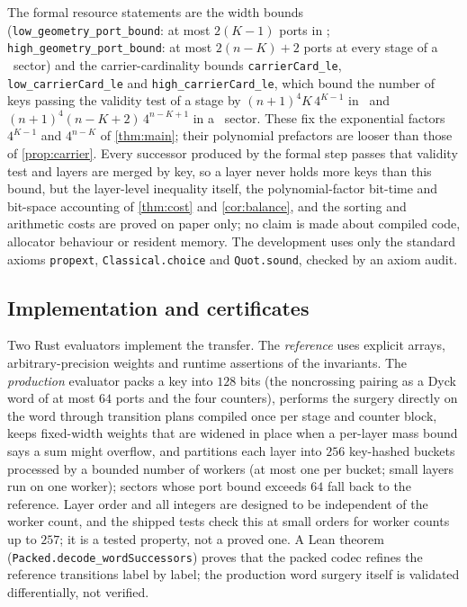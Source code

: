 The formal resource statements are the width bounds
(\texttt{low\_geometry\_port\_bound}: at most $2(K-1)$ ports in \LOW;
\texttt{high\_geometry\_port\_bound}: at most $2(n-K)+2$ ports at every
stage of a \HIGH\ sector) and the carrier-cardinality bounds
\texttt{carrierCard\_le},
\texttt{low\_carrierCard\_le} and
\texttt{high\_carrierCard\_le}, which bound the number of keys passing the
validity test of a stage by $(n+1)^{4}K\,4^{K-1}$ in \LOW\ and
$(n+1)^{4}(n-K+2)\,4^{n-K+1}$ in a \HIGH\ sector. These fix the exponential
factors $4^{K-1}$ and $4^{n-K}$ of \cref{thm:main}; their polynomial
prefactors are looser than those of \cref{prop:carrier}. Every successor
produced by the formal step passes that validity test and layers are merged
by key, so a layer never holds more keys than this bound, but the layer-level
inequality itself, the polynomial-factor bit-time and bit-space accounting of
\cref{thm:cost} and \cref{cor:balance}, and the sorting and arithmetic costs
are proved on paper only; no claim is made about compiled code, allocator
behaviour or resident memory. The development uses
only the standard axioms \texttt{propext}, \texttt{Classical.choice} and
\texttt{Quot.sound}, checked by an axiom audit.

\subsection{Implementation and certificates}

Two Rust evaluators implement the transfer. The \emph{reference} uses explicit
arrays, arbitrary-precision weights and runtime assertions of the invariants.
The \emph{production} evaluator packs a key into $128$ bits (the noncrossing
pairing as a Dyck word of at most $64$ ports and the four counters), performs
the surgery directly on the word through transition plans compiled once per
stage and counter block, keeps fixed-width weights that are widened in place
when a per-layer mass bound says a sum might overflow, and partitions each
layer into $256$ key-hashed buckets processed by a bounded number of workers
(at most one per bucket; small layers run on one worker); sectors whose port
bound exceeds $64$ fall back to the reference. Layer order and all integers
are designed to be independent of the worker count, and the shipped tests
check this at small orders for worker counts up to $257$; it is a tested
property, not a proved one. A Lean theorem
(\texttt{Packed.decode\_wordSuccessors}) proves that the packed codec refines the
reference transitions label by label; the production word surgery itself is
validated differentially, not verified.

